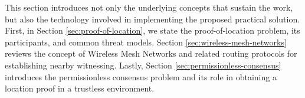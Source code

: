 This section introduces not only the underlying concepts that sustain the work, but also the technology involved in implementing the proposed practical solution. First, in Section \ref{sec:proof-of-location}, we state the proof-of-location problem, its participants, and common threat models. Section \ref{sec:wireless-mesh-networks} reviews the concept of Wireless Mesh Networks and related routing protocols for establishing nearby witnessing. Lastly, Section \ref{sec:permissionless-consensus} introduces the permissionless consensus problem and its role in obtaining a location proof in a trustless environment.